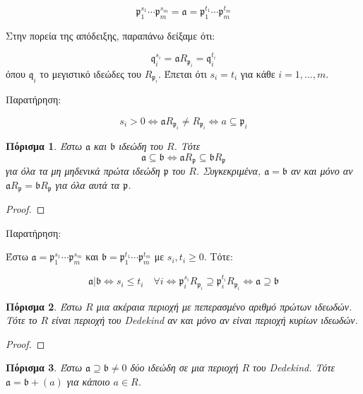 \documentclass[oneside,a4paper]{article}
\newtheorem{cor}{Πόρισμα}
\newcommand {\tl}{\textlatin}
\begin{document}
$$\mathfrak{p}^{s_1}_1 \cdots \mathfrak{p}^{s_m}_m = \mathfrak{a} = \mathfrak{p}^{t_1}_1  \cdots \mathfrak{p}^{t_m}_m$$

Στην πορεία της απόδειξης, παραπάνω δείξαμε ότι:

$$\mathfrak{q}^{s_i}_i = \mathfrak{a}R_{\mathfrak{p}_i} = \mathfrak{q}^{t_i}_i$$ όπου $\mathfrak{q}_i$ το μεγιστικό ιδεώδες του $R_{\mathfrak{p}_i}$. Έπεται ότι $s_i = t_i$ για κάθε $i = 1,\ldots,m$.



Παρατήρηση:

$$s_i > 0 \iff \mathfrak{a} R_{\mathfrak{p}_i} \neq R_{\mathfrak{p}_i} \iff a\subseteq \mathfrak{p}_i$$


\begin{cor}
	Έστω $\mathfrak{a}$ και $\mathfrak{b}$ ιδεώδη του $R$. Τότε
	$$\mathfrak{a} \subseteq \mathfrak{b} \iff \mathfrak{a} R_{\mathfrak{p}} \subseteq \mathfrak{b} R_{\mathfrak{p}}$$ για όλα τα μη μηδενικά πρώτα ιδεώδη $\mathfrak{p}$ του $R$. Συγκεκριμένα, $\mathfrak{a} = \mathfrak{b}$ αν και μόνο αν $\mathfrak{a} R_{\mathfrak{p}} = \mathfrak{b} R_{\mathfrak{p}}$ για όλα αυτά τα $\mathfrak{p}$.
\end{cor}

\begin{proof}
\end{proof}


Παρατήρηση:


Έστω $\mathfrak{a} = \mathfrak{p}^{s_1}_1 \cdots \mathfrak{p}^{s_m}_m$ και $\mathfrak{b} = \mathfrak{p}^{t_1}_1 \cdots \mathfrak{p}^{t_m}_m$ με $s_i,t_i \geq 0$. Τότε:

$$\mathfrak{a} | \mathfrak{b} \iff s_i \leq t_i \quad\forall i \iff \mathfrak{p}^{s_i}_i R_{\mathfrak{p}_i} \supseteq \mathfrak{p}^{t_i}_i R_{\mathfrak{p}_i} \iff \mathfrak{a} \supseteq \mathfrak{b}$$

\begin{cor} Έστω $R$ μια ακέραια περιοχή με πεπερασμένο αριθμό πρώτων ιδεωδών. Τότε το $R$ είναι περιοχή του \tl{Dedekind} αν και μόνο αν είναι περιοχή κυρίων ιδεωδών.
\end{cor}

\begin{proof}
\end{proof}

\begin{cor}
	Έστω $\mathfrak{a} \supseteq \mathfrak{b} \neq 0$ δύο ιδεώδη σε μια περιοχή $R$ του \tl{Dedekind}. Τότε $\mathfrak{a} = \mathfrak{b} + (a)$ για κάποιο $a \in R$.
\end{cor}
\end{document}
